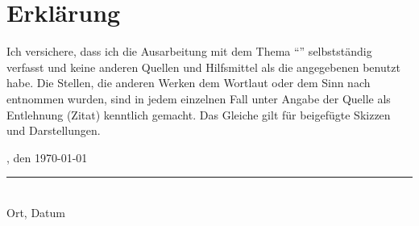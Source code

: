 \cleardoublepage%
\pagestyle{plain}

\chapter*{Erklärung}
    Ich versichere, dass ich die Ausarbeitung mit dem Thema \enquote{\Subject} selbstständig
    verfasst und keine anderen Quellen und Hilfsmittel als die angegebenen benutzt habe. Die
    Stellen, die anderen Werken dem Wortlaut oder dem Sinn nach entnommen wurden, sind in jedem
    einzelnen Fall unter Angabe der Quelle als Entlehnung (Zitat) kenntlich gemacht. Das Gleiche
    gilt für beigefügte Skizzen und Darstellungen.\\[4cm]
    \parbox{\textwidth}{%
        \parbox[b]{7cm}{%
            \Location, den \today\\[-0.3cm]
            \rule{6cm}{1pt}\\
            Ort, Datum
        }
        \hfill%
        \parbox[b]{7cm}{%
            \Signature%
        }
    }
